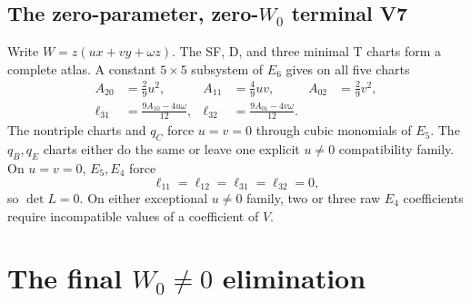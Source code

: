 \documentclass[11pt]{article}
\theoremstyle{remark}
\begin{document}
\subsection{The zero-parameter, zero-$W_0$ terminal V7}

Write $W=z(ux+vy+\omega z)$.  The SF, D, and three minimal T charts form
a complete atlas.  A constant $5\times5$ subsystem of $E_6$ gives on all
five charts
\[
\begin{aligned}
A_{20}&=\frac29u^2,&A_{11}&=\frac49uv,&A_{02}&=\frac29v^2,\\
\ell_{31}&=\frac{9A_{10}-4u\omega}{12},&
\ell_{32}&=\frac{9A_{01}-4v\omega}{12}.
\end{aligned}
\]
The nontriple charts and $q_C$ force $u=v=0$ through cubic monomials of
$E_5$.  The $q_B,q_E$ charts either do the same or leave one explicit
$u\ne0$ compatibility family.  On $u=v=0$, $E_5,E_4$ force
\[
 \ell_{11}=\ell_{12}=\ell_{31}=\ell_{32}=0,
\]
so $\det L=0$.  On either exceptional $u\ne0$ family, two or three raw
$E_4$ coefficients require incompatible values of a coefficient of $V$.

\section{The final $W_0\ne0$ elimination}
\end{document}

